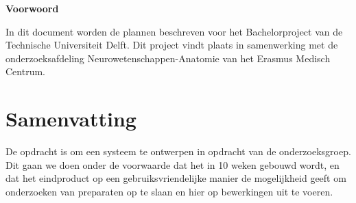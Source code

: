 \begin{center}
\textbf{\large Voorwoord}
\end{center}



In dit document worden de plannen beschreven voor het Bachelorproject \casam van de Technische Universiteit Delft.
Dit project vindt plaats in samenwerking met de onderzoeksafdeling Neurowetenschappen-Anatomie van het Erasmus Medisch Centrum.

\section*{Samenvatting}


De opdracht is om een systeem te ontwerpen in opdracht van de \casam onderzoeksgroep.
Dit gaan we doen onder de voorwaarde dat het in 10 weken gebouwd wordt, en dat het eindproduct op een gebruiksvriendelijke manier de mogelijkheid geeft om onderzoeken van preparaten op te slaan en hier op bewerkingen uit te voeren.
